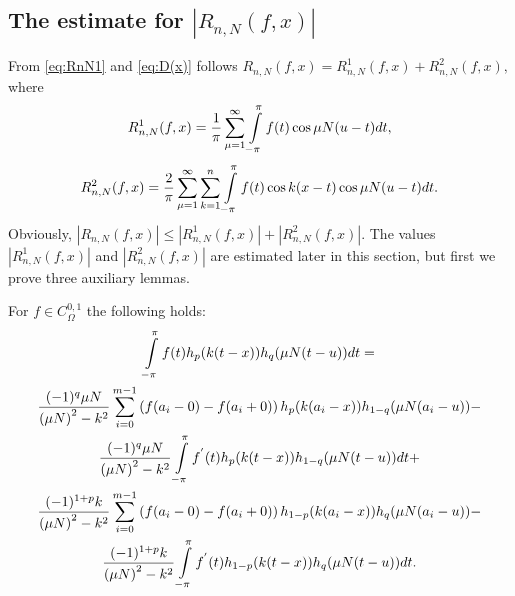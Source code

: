 %	

\subsection{The estimate for $\left|R_{n,N}(f,x)\right|$}

From \eqref{eq:RnN1} and \eqref{eq:D(x)} follows
$
R_{n,N}(f,x)=R_{n,N}^{1}(f,x)+R_{n,N}^{2}(f,x),
$
where
\begin{equation*}
R_{n,N}^{1}(f,x)=\frac{1}{\pi}\sum_{\mu=1}^{\infty}\intop_{-\pi}^{\pi}f(t)\cos\mu N(u-t)dt,\label{eq:R1_formula1}
\end{equation*}
\begin{equation}
R_{n,N}^{2}(f,x)=\frac{2}{\pi}\sum_{\mu=1}^{\infty}\sum_{k=1}^{n}\intop_{-\pi}^{\pi}f(t)\cos k(x-t)\cos\mu N(u-t)dt.\label{eq:R2_formula1}
\end{equation}
Obviously,
$
\left|R_{n,N}(f,x)\right| \leq \left|R_{n,N}^{1}(f,x)\right| + \left|R_{n,N}^{2}(f,x)\right|
$. The values $\left|R_{n,N}^{1}(f,x)\right|$ and $\left|R_{n,N}^{2}(f,x)\right|$ are estimated later in this section, but first we prove three auxiliary lemmas.

\begin{lemma}\label{hlemma}
	For $f \in C_\Omega^{0,1}$ the following holds:
	\begin{multline}\label{hlemma_eq1}
	\intop_{-\pi}^{\pi}f(t)h_{p}(k(t-x))h_{q}(\mu N(t-u))dt= \\
	\frac{(-1)^{q}\mu N}{\left(\mu N\right)^{2}-k^{2}}\sum_{i=0}^{m-1}\left(f(a_{i}-0)-f(a_{i}+0)\right)h_{p}(k(a_{i}-x))h_{1-q}(\mu N(a_{i}-u))-\\
	\frac{(-1)^{q}\mu N}{\left(\mu N\right)^{2}-k^{2}}\intop_{-\pi}^{\pi}f^{'}(t)h_{p}(k(t-x))h_{1-q}(\mu N(t-u))dt+\\
	\frac{(-1)^{1+p}k}{\left(\mu N\right)^{2}-k^{2}}\sum_{i=0}^{m-1}\left(f(a_{i}-0)-f(a_{i}+0)\right)h_{1-p}(k(a_{i}-x))h_{q}(\mu N(a_{i}-u))-\\
	\frac{(-1)^{1+p}k}{\left(\mu N\right)^{2}-k^{2}}\intop_{-\pi}^{\pi}f^{'}(t)h_{1-p}(k(t-x))h_{q}(\mu N(t-u))dt.
	\end{multline}
\end{lemma}

